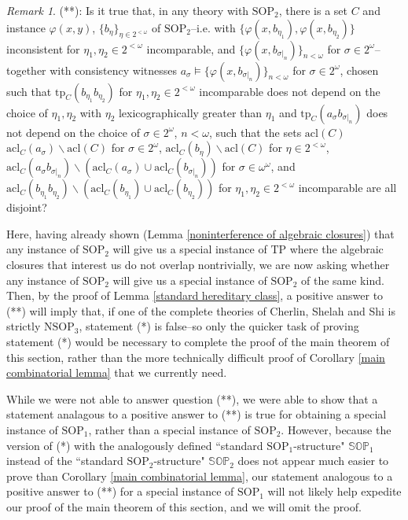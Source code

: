 \documentclass{amsart}
\theoremstyle{definition}
\theoremstyle{remark}
\newtheorem{remark}[theorem]{Remark}
\numberwithin{equation}{section}
\begin{document}
\begin{remark}
(**): Is it true that, in any theory with $\mathrm{SOP}_{2}$, there is a set $C$ and instance $\varphi(x, y)$, $\{b_{\eta}\}_{\eta \in 2^{< \omega}}$ of $\mathrm{SOP}_{2}$--i.e. with $\{\varphi(x, b_{\eta_1}), \varphi(x, b_{\eta_{2}})\}$ inconsistent for $\eta_1, \eta_2 \in 2^{<\omega}$ incomparable, and $\{\varphi(x, b_{\sigma|_{n}})\}_{n < \omega}$ for $\sigma \in 2^{\omega}$--together with consistency witnesses $a_{\sigma} \models \{\varphi(x, b_{\sigma|_{n}})\}_{n < \omega}$ for $\sigma \in 2^{\omega}$, chosen such that $\mathrm{tp}_{C}(b_{\eta_1}b_{\eta_2})$ for $\eta_1, \eta_2 \in 2^{<\omega}$ incomparable does not depend on the choice of $\eta_{1}, \eta_{2}$ with $\eta_{2}$ lexicographically greater than $\eta_{1}$ and $\mathrm{tp}_{C}(a_{\sigma}b_{\sigma|_{n}})$ does not depend on the choice of $\sigma \in 2^{ \omega}$, $n < \omega$, such that the sets $\mathrm{acl}(C)$ $\mathrm{acl}_{C}(a_{\sigma}) \backslash \mathrm{acl}(C)$ for $\sigma \in 2^{\omega}$, $\mathrm{acl}_{C}(b_{\eta}) \backslash \mathrm{acl}(C)$ for $\eta \in 2^{< \omega}$, $\mathrm{acl}_{C}(a_{\sigma} b_{\sigma|_{n}})\backslash (\mathrm{acl}_{C}(a_{\sigma} ) \cup \mathrm{acl}_{C}(b_{\sigma|_{n}}))$ for $\sigma \in \omega^{\omega}$, and $\mathrm{acl}_{C}(b_{\eta_{1}}b_{\eta_{2}}) \backslash (\mathrm{acl}_{C}(b_{\eta_{1}})\cup \mathrm{acl}_{C}(b_{\eta_{2}}))$ for $\eta_1, \eta_2 \in 2^{<\omega}$ incomparable are all disjoint?



Here, having already shown (Lemma \ref{noninterference of algebraic closures}) that any instance of $\mathrm{SOP}_{2}$ will give us a special instance of $\mathrm{TP}$ where the algebraic closures that interest us do not overlap nontrivially, we are now asking whether any instance of $\mathrm{SOP}_2$ will give us a special instance of $\mathrm{SOP}_{2}$ of the same kind. Then, by the proof of Lemma \ref{standard hereditary class}, a positive answer to (**) will imply that, if one of the complete theories of Cherlin, Shelah and Shi is strictly $\mathrm{NSOP}_{3}$, statement (*) is false--so only the quicker task of proving statement (*) would be necessary to complete the proof of the main theorem of this section, rather than the more technically difficult proof of Corollary \ref{main combinatorial lemma} that we currently need. 


While we were not able to answer question (**), we were able to show that a statement analagous to a positive answer to (**) is true for obtaining a special instance of $\mathrm{SOP}_{1}$, rather than a special instance of $\mathrm{SOP}_{2}$. However, because the version of (*) with the analogously defined ``standard $\mathrm{SOP}_{1}$-structure" $\mathbb{SOP}_{1}$ instead of the ``standard $\mathrm{SOP}_{2}$-structure" $\mathbb{SOP}_{2}$ does not appear much easier to prove than Corollary \ref{main combinatorial lemma}, our statement analogous to a positive answer to (**) for a special instance of $\mathrm{SOP}_{1}$ will not likely help expedite our proof of the main theorem of this section, and we will omit the proof.


    
 \end{remark}
\end{document}
